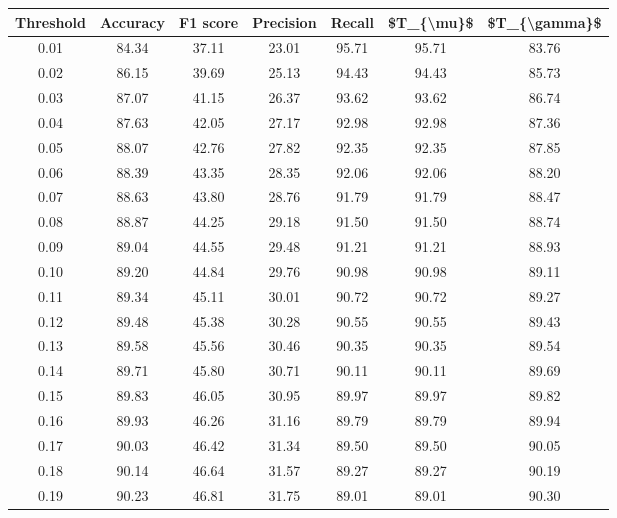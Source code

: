 \begin{tabular}{|c|c|c|c|c|c|c|}
\hline
 Threshold &  Accuracy &  F1 score &  Precision &  Recall &  \$T\_\{\textbackslash mu\}\$ &  \$T\_\{\textbackslash gamma\}\$ \\
\hline
      0.01 &     84.34 &     37.11 &      23.01 &   95.71 &      95.71 &         83.76 \\
      0.02 &     86.15 &     39.69 &      25.13 &   94.43 &      94.43 &         85.73 \\
      0.03 &     87.07 &     41.15 &      26.37 &   93.62 &      93.62 &         86.74 \\
      0.04 &     87.63 &     42.05 &      27.17 &   92.98 &      92.98 &         87.36 \\
      0.05 &     88.07 &     42.76 &      27.82 &   92.35 &      92.35 &         87.85 \\
      0.06 &     88.39 &     43.35 &      28.35 &   92.06 &      92.06 &         88.20 \\
      0.07 &     88.63 &     43.80 &      28.76 &   91.79 &      91.79 &         88.47 \\
      0.08 &     88.87 &     44.25 &      29.18 &   91.50 &      91.50 &         88.74 \\
      0.09 &     89.04 &     44.55 &      29.48 &   91.21 &      91.21 &         88.93 \\
      0.10 &     89.20 &     44.84 &      29.76 &   90.98 &      90.98 &         89.11 \\
      0.11 &     89.34 &     45.11 &      30.01 &   90.72 &      90.72 &         89.27 \\
      0.12 &     89.48 &     45.38 &      30.28 &   90.55 &      90.55 &         89.43 \\
      0.13 &     89.58 &     45.56 &      30.46 &   90.35 &      90.35 &         89.54 \\
      0.14 &     89.71 &     45.80 &      30.71 &   90.11 &      90.11 &         89.69 \\
      0.15 &     89.83 &     46.05 &      30.95 &   89.97 &      89.97 &         89.82 \\
      0.16 &     89.93 &     46.26 &      31.16 &   89.79 &      89.79 &         89.94 \\
      0.17 &     90.03 &     46.42 &      31.34 &   89.50 &      89.50 &         90.05 \\
      0.18 &     90.14 &     46.64 &      31.57 &   89.27 &      89.27 &         90.19 \\
      0.19 &     90.23 &     46.81 &      31.75 &   89.01 &      89.01 &         90.30 \\

\end{tabular}
